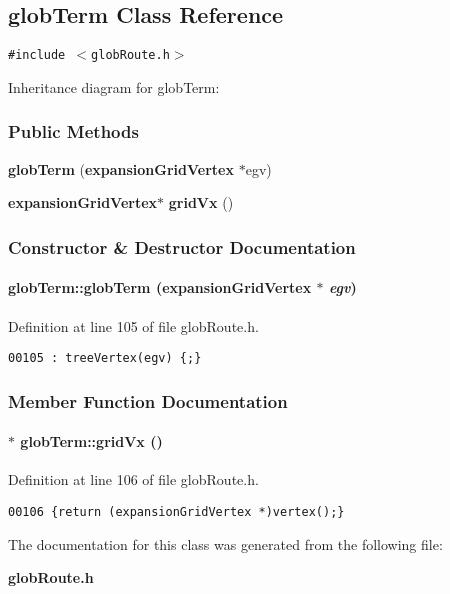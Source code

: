 \subsection{glob\-Term  Class Reference}
\label{globTerm}
{\tt \#include $<$glob\-Route.h$>$}

Inheritance diagram for glob\-Term:\begin{figure}[H]
\begin{center}
\leavevmode
\setlength{\epsfysize}{2cm}
\end{center}
\end{figure}
\subsubsection*{Public Methods}
\begin{CompactItemize}
\item 
{\bf glob\-Term} ({\bf expansion\-Grid\-Vertex} $\ast$egv)
\item 
{\bf expansion\-Grid\-Vertex}$\ast$ {\bf grid\-Vx} ()
\end{CompactItemize}


\subsubsection{Constructor \& Destructor Documentation}
\label{globTerm_a0}
\paragraph{\setlength{\rightskip}{0pt plus 5cm}glob\-Term::glob\-Term ({\bf expansion\-Grid\-Vertex} $\ast$ {\em egv})}\hfill



Definition at line 105 of file glob\-Route.h.\small\begin{verbatim}00105 : treeVertex(egv) {;}
\end{verbatim}\normalsize 


\subsubsection{Member Function Documentation}
\label{globTerm_a1}
\paragraph{ $\ast$ glob\-Term::grid\-Vx ()\hspace{0.3cm}{\tt  [inline]}}\hfill



Definition at line 106 of file glob\-Route.h.\small\begin{verbatim}00106 {return (expansionGridVertex *)vertex();}
\end{verbatim}\normalsize 


The documentation for this class was generated from the following file:\begin{CompactItemize}
\item 
{\bf glob\-Route.h}\end{CompactItemize}
